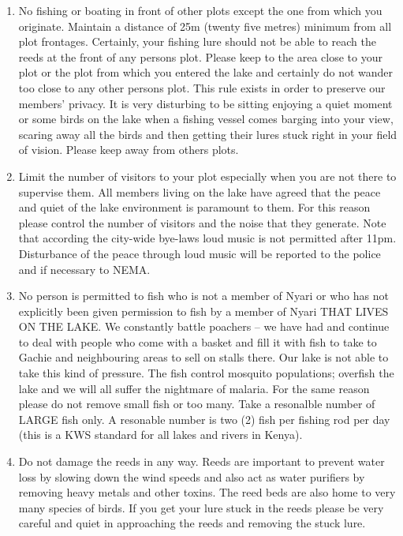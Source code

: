 \documentclass[a4paper,10pt, oneside]{letter}
\begin{document}
\begin{letter} {}
\begin{enumerate}
\item No fishing or boating in front of other plots except the one from which you originate. Maintain a distance of 25m (twenty five metres) minimum from all plot frontages. Certainly, your fishing lure should not be able to reach the reeds at the front of any persons plot. Please keep to the area close to your plot or the plot from which you entered the lake and certainly do not wander too close to any other persons plot. This rule exists in order to preserve our members' privacy. It is very disturbing to be sitting enjoying a quiet moment or some birds on the lake when a fishing vessel comes barging into your view, scaring away all the birds and then getting their lures stuck right in your field of vision. Please keep away from others plots.

\item Limit the number of visitors to your plot especially when you are not there to supervise them. All members living on the lake have agreed that the peace and quiet of the lake environment is paramount to them. For this reason please control the number of visitors and the noise that they generate. Note that according the city-wide bye-laws loud music is not permitted after 11pm. Disturbance of the peace through loud music will be reported to the police and if necessary to NEMA.

\item No person is permitted to fish who is not a member of Nyari or who has not explicitly been given permission to fish by a member of Nyari THAT LIVES ON THE LAKE. We constantly battle poachers -- we have had and continue to deal with people who come with a basket and fill it with fish to take to Gachie and neighbouring areas to sell on stalls there. Our lake is not able to take this kind of pressure. The fish control mosquito populations; overfish the lake and we will all suffer the nightmare of malaria. For the same reason please do not remove small fish or too many. Take a resonalble number of LARGE fish only. A resonable number is two (2) fish per fishing rod per day (this is a KWS standard for all lakes and rivers in Kenya).

\item Do not damage the reeds in any way. Reeds are important to prevent water loss by slowing down the wind speeds and also act as water purifiers by removing heavy metals and other toxins. The reed beds are also home to very many species of birds. If you get your lure stuck in the reeds please be very careful and quiet in approaching the reeds and removing the stuck lure.


\end{enumerate}
\end{letter}
\end{document}
